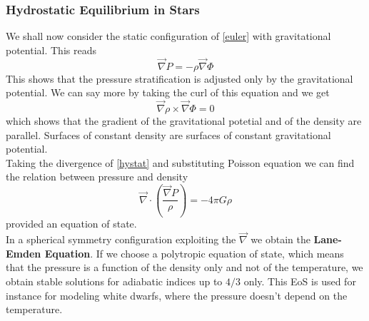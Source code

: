 \documentclass[11pt]{article}
\numberwithin{equation}{section}
\begin{document}
\subsubsection{Hydrostatic Equilibrium in Stars}
We shall now consider the static configuration of \ref{euler} with gravitational potential. This reads
\begin{equation} \label{hystat}
	\vec \nabla P = - \rho \vec \nabla \Phi
\end{equation}
This shows that the pressure stratification is adjusted only by the gravitational potential. We can say more by taking the curl of this equation and we get
$$
\vec \nabla \rho \times  \vec \nabla \Phi =0
$$
which shows that the gradient of the gravitational potetial and of the density are parallel. Surfaces of constant density are surfaces of constant gravitational potential.\\
Taking the divergence of \ref{hystat} and substituting Poisson equation we can find the relation between pressure and density
$$
\vec \nabla \cdot \left ( \frac{\vec \nabla P}{\rho} \right ) = - 4 \pi G \rho 
$$
provided an equation of state.\\
In a spherical symmetry configuration exploiting the $\vec \nabla$ we obtain the \textbf{Lane-Emden Equation}. If we choose a polytropic equation of state, which means that the pressure is a function of the density only and not of the temperature, we obtain stable solutions for adiabatic indices up to $4/3$ only. This EoS is used for instance for modeling white dwarfs, where the pressure doesn't depend on the temperature. \\ 
\end{document}
